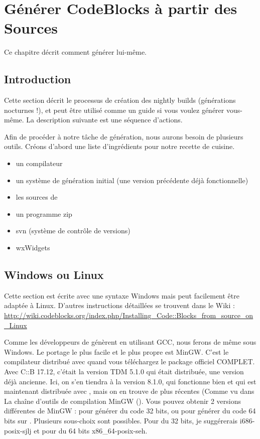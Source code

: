 \chapter{Générer CodeBlocks à partir des Sources}\label{sec:build_codeblocks}

Ce chapitre décrit comment générer \codeblocks lui-même.


\section{Introduction}

Cette section décrit le processus de création des nightly builds (générations nocturnes !), et peut être utilisé comme un guide si vous voulez générer \codeblocks vous-même. La description suivante est une séquence d'actions.

Afin de procéder à notre tâche de génération, nous aurons besoin de plusieurs outils. Créons d'abord une liste d'ingrédients pour notre recette de cuisine.

\begin{itemize}
\item un compilateur
\item un système de génération initial (une version précédente déjà fonctionnelle)
\item les sources de \codeblocks
\item un programme zip
\item svn (système de contrôle de versions)
\item wxWidgets
\end{itemize}

\section{Windows ou Linux}

Cette section est écrite avec une syntaxe Windows mais peut facilement être adaptée à Linux.
D'autres instructions détaillées se trouvent dans le Wiki : \url{http://wiki.codeblocks.org/index.php/Installing_Code::Blocks_from_source_on_Linux}

Comme les développeurs de \codeblocks génèrent \codeblocks en utilisant GCC, nous ferons de même sous Windows. Le portage le plus facile et le plus propre est MinGW. C'est le compilateur distribué avec \codeblocks quand vous téléchargez le package officiel COMPLET. Avec C::B 17.12, c'était la version TDM 5.1.0 qui était distribuée, une version déjà ancienne. Ici, on s'en tiendra à la version 8.1.0, qui fonctionne bien et qui est maintenant distribuée avec , mais on en trouve de plus récentes (Comme vu dans La chaîne d'outils de compilation MinGW (). Vous pouvez obtenir 2 versions différentes de MinGW : pour générer du code 32 bits, ou pour générer du code 64 bits sur \cite{url:mingw64}. Plusieurs sous-choix sont possibles. Pour du 32 bits, je suggérerais i686-posix-sjlj et pour du 64 bits x86\_64-posix-seh.

